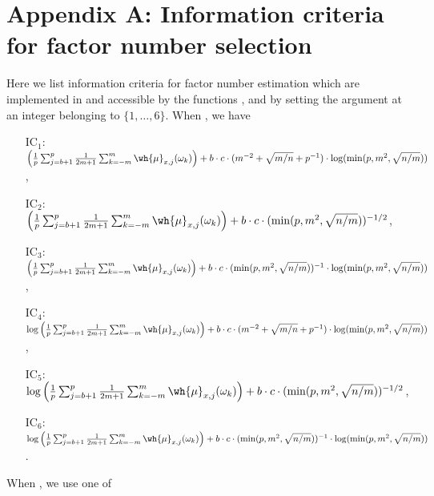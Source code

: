 \section{Appendix A: Information criteria for factor number selection}
\label{sec:factornumber}

Here we list information criteria for factor number estimation which are implemented in  and accessible by the functions ,  and  by setting the argument  at an integer belonging to $\{1, \ldots, 6\}$.
When , we have
\begin{itemize}
    \item[IC$_1$:] 	$ \left(\frac{1}{p} \sum _{j = b + 1}^p \frac{1}{2m + 1} \sum_{k = -m}^m \wh{\mu}_{x, j}(\omega_k) \right)
 + b \cdot c \cdot( m^{-2} + \sqrt{m / n} + p^{-1}) \cdot \log(\min (p, m^2, \sqrt{n / m} ))$,
     \item[IC$_2$:] 	$ \left(\frac{1}{p} \sum _{j = b + 1}^p \frac{1}{2m + 1} \sum_{k = -m}^m \wh{\mu}_{x, j}(\omega_k) \right)
 + b \cdot c \cdot (\min(p, m^2, \sqrt{n / m}))^{-1/2}$, 
      \item[IC$_3$:] 	$ \left(\frac{1}{p} \sum _{j = b + 1}^p \frac{1}{2m + 1} \sum_{k = -m}^m \wh{\mu}_{x, j}(\omega_k) \right) 
 + b \cdot c \cdot (\min(p, m^2, \sqrt{n / m}))^{-1} \cdot \log(\min(p, m^2, \sqrt{n / m}))$,
    \item[IC$_4$:] 	$\log \left(\frac{1}{p} \sum _{j = b + 1}^p \frac{1}{2m + 1} \sum_{k = -m}^m \wh{\mu}_{x, j}(\omega_k) \right) 
 + b \cdot c \cdot( m^{-2} + \sqrt{m / n} + p^{-1}) \cdot \log(\min (p, m^2, \sqrt{n / m} ))$,
     \item[IC$_5$:] 	$\log \left(\frac{1}{p} \sum _{j = b + 1}^p \frac{1}{2m + 1} \sum_{k = -m}^m \wh{\mu}_{x, j}(\omega_k) \right) 
 + b \cdot c \cdot (\min(p, m^2, \sqrt{n / m}))^{-1/2}$,
      \item[IC$_6$:] 	$\log \left(\frac{1}{p} \sum _{j = b + 1}^p \frac{1}{2m + 1} \sum_{k = -m}^m \wh{\mu}_{x, j}(\omega_k) \right) 
 + b \cdot c \cdot (\min(p, m^2, \sqrt{n / m}))^{-1} \cdot \log(\min(p, m^2, \sqrt{n / m}))$ .
\end{itemize}
When , we use one of 
